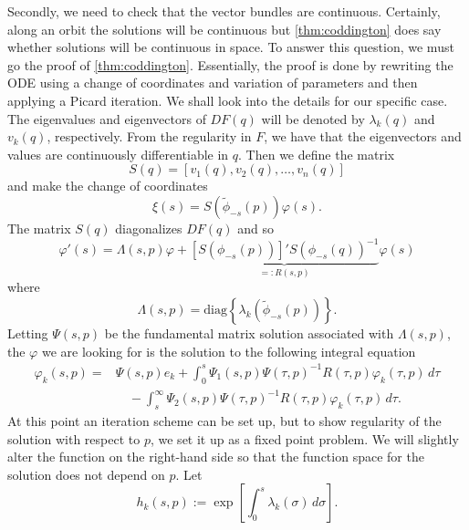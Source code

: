 Secondly, we need to check that the vector bundles are continuous. Certainly, along an orbit the solutions will be continuous but \cref{thm:coddington} does say whether solutions will be continuous in space. To answer this question, we must go the proof of \cref{thm:coddington}. Essentially, the proof is done by rewriting the ODE using a change of coordinates and variation of parameters and then applying a Picard iteration. We shall look into the details for our specific case. The eigenvalues and eigenvectors of \(DF(q)\) will be denoted by \(\lambda_k(q)\) and \(v_k(q)\), respectively. From the regularity in \(F\), we have that the eigenvectors and values are continuously differentiable in \(q\). Then we define the matrix
\begin{equation}
	S(q) = [v_1(q), v_2(q), \ldots, v_n(q)]
\end{equation}
and make the change of coordinates
\begin{equation}
	\xi(s) = S(\tilde \phi_{-s} (p)) \varphi(s).
\end{equation}
The matrix \(S(q)\) diagonalizes \(DF(q)\) and so 
\begin{equation}
	\varphi'(s) = \Lambda(s,p)\varphi + \underbrace{[S(\phi_{-s}(p))]' S(\phi_{-s}(q))^{-1}}_{=: R(s,p)} \varphi(s)
\end{equation}
where 
\begin{equation}
	\Lambda(s,p) = \mathrm{diag} \left\{  \lambda_k(\tilde\phi_{-s}(p))\right\}.
\end{equation}
Letting \(\Psi(s,p)\) be the fundamental matrix solution associated with \(\Lambda(s,p)\), the \(\varphi\) we are looking for is the solution to the following integral equation
\begin{equation}\label{variation-of-constants}
\begin{aligned}
		\varphi_k(s,p) = &\Psi(s,p) e_k + \int_0^s \Psi_1(s, p) \Psi(\tau, p)^{-1}R(\tau, p) \varphi_k(\tau,p)\, d\tau \\
		&\quad - \int_s^\infty \Psi_2(s,p) \Psi(\tau, p)^{-1} R(\tau, p) \varphi_k(\tau, p)\, d\tau.
\end{aligned}
\end{equation}
At this point an iteration scheme can be set up, but to show regularity of the solution with respect to \(p\), we set it up as a fixed point problem. We will slightly alter the function on the right-hand side so that the function space for the solution does not depend on \(p\). Let 
\begin{equation}
	h_k(s,p) := \exp\left[\int_0^s \lambda_k(\sigma)\, d\sigma\right].
\end{equation}
